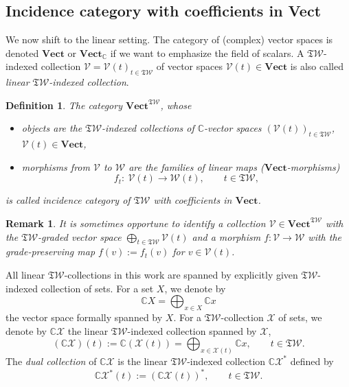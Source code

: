 \documentclass[pdftex]{sigma}
\newcommand{\linearspan}[1]{{\CC #1}}
\newcommand{\SWc}{{\mathfrak{T}\mathcal{W}}}
\newcommand\CAT[1]{\mathbf{#1}}
\newcommand{\Vect}{\CAT{Vect}}
\def\CC{\mathbb{C}}
\numberwithin{equation}{section}
\newtheorem{Definition}[Theorem]{Definition}
\newtheorem{Remark}[Theorem]{Remark}
\begin{document}
\subsection{Incidence category with coefficients in Vect}
\label{subsec:monoidalindexedmord-vect}

We now shift to the linear setting. The category of (complex) vector spaces is denoted $\Vect$ or $\Vect_\CC $ if we want to emphasize the field of scalars. A $\SWc$-indexed collection $\mathcal V=\mathcal{V}(t)_{t\in\SWc}$ of vector spaces $\mathcal{V}(t)\in \Vect$ is also called {\it linear $\SWc$-indexed collection}.

\begin{Definition}
 The category $\Vect^{\SWc}$, whose
\begin{itemize}\itemsep=0pt
 \item objects are the {\it $\SWc$-indexed collections of $\CC $-vector spaces}
	$(\mathcal{V}(t))_{t \in \SWc}$, $\mathcal{V}(t) \in \Vect$,
	\item morphisms from $\mathcal{V}$ to $\mathcal{W}$
are the families of linear maps ($\Vect$-morphisms)
\[f_{t}\colon \ \mathcal{V}(t) \to \mathcal{W}(t),\qquad t \in \SWc,\]
\end{itemize}
is called {\it incidence category of $\SWc$ with coefficients in $\Vect$}.
\end{Definition}

\begin{Remark}
 It is sometimes opportune to identify a collection $\mathcal V\in \Vect^\SWc$ with the $\SWc$-graded vector space $\bigoplus_{t\in\SWc} \mathcal V(t)$ and a morphism $f\colon \mathcal V\to \mathcal W$ with the grade-preserving map $f(v):=f_t(v)$ for $v\in\mathcal V(t)$.
\end{Remark}

All linear $\SWc$-collections in this work are spanned by explicitly given $\SWc$-indexed collection of sets. For a set $X$, we denote by \[\linearspan{X}=\bigoplus_{x\in X}\linearspan{x}\] the vector space formally spanned by $X$.
For a $\SWc$-collection $\mathcal{X}$ of sets, we denote by $\linearspan{\mathcal{X}}$ the linear $\SWc$-indexed collection spanned by $\mathcal{X}$,
\begin{equation*}
 (\linearspan{\mathcal{X}})(t)
 :=\linearspan{(\mathcal X(t))}
	=\bigoplus_{x\in\mathcal{X}(t)}\linearspan{x},\qquad t \in \SWc.
\end{equation*}
The {\it dual collection} of $\linearspan{\mathcal{X}}$ is the linear $\SWc$-indexed collection $\linearspan{\mathcal{X}}^{\ast}$ defined by
\[ \linearspan{\mathcal{X}}^{\ast}(t) := \left(\linearspan{\mathcal{X}}(t)\right)^{\ast},\qquad t \in \SWc .\]
\end{document}
